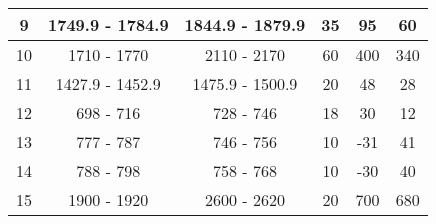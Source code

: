 \begin{table}[]
\begin{tabular}{|c|c|c|c|c|c|}
9                                                           & 1749.9 - 1784.9                                        & 1844.9 - 1879.9                                          & 35                                                                   & 95                                                               & 60                                                          \\ \hline
10                                                          & 1710 - 1770                                            & 2110 - 2170                                              & 60                                                                   & 400                                                              & 340                                                         \\ \hline
11                                                          & 1427.9 - 1452.9                                        & 1475.9 - 1500.9                                          & 20                                                                   & 48                                                               & 28                                                          \\ \hline
12                                                          & 698 - 716                                              & 728 - 746                                                & 18                                                                   & 30                                                               & 12                                                          \\ \hline
13                                                          & 777 - 787                                              & 746 - 756                                                & 10                                                                   & -31                                                              & 41                                                          \\ \hline
14                                                          & 788 - 798                                              & 758 - 768                                                & 10                                                                   & -30                                                              & 40                                                          \\ \hline
15                                                          & 1900 - 1920                                            & 2600 - 2620                                              & 20                                                                   & 700                                                              & 680                                                         \\ \hline

\end{tabular}
\end{table}
